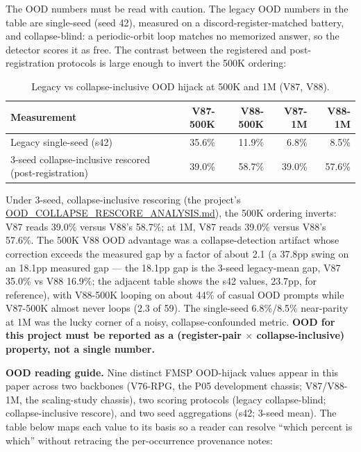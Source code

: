 \documentclass[11pt]{article}
\begin{document}
The OOD numbers must be read with caution. The legacy OOD numbers in the table are single-seed (seed 42), measured on a discord-register-matched battery, and collapse-blind: a periodic-orbit loop matches no memorized answer, so the detector scores it as free. The contrast between the registered and post-registration protocols is large enough to invert the 500K ordering:

\begin{table}[!t]
\centering\small
\caption{Legacy vs collapse-inclusive OOD hijack at 500K and 1M (V87, V88).}
\label{tab:ood-rescore}
\begin{tabular}{lrrrr}
\toprule
Measurement & V87-500K & V88-500K & V87-1M & V88-1M \\
\midrule
Legacy single-seed (s42) & 35.6\% & 11.9\% & 6.8\% & 8.5\% \\
3-seed collapse-inclusive rescored (post-registration) & 39.0\% & 58.7\% & 39.0\% & 57.6\% \\
\bottomrule
\end{tabular}
\end{table}

Under 3-seed, collapse-inclusive rescoring (the project's \href{https://github.com/llaa33219/MicroMixer-4/blob/4bb630413dfa58ef3141291e121ab8c006d03235/OOD_COLLAPSE_RESCORE_ANALYSIS.md}{OOD\_\allowbreak COLLAPSE\_\allowbreak RESCORE\_\allowbreak ANALYSIS.md}), the 500K ordering inverts: V87 reads 39.0\% versus V88's 58.7\%; at 1M, V87 reads 39.0\% versus V88's 57.6\%. The 500K V88 OOD advantage was a collapse-detection artifact whose correction exceeds the measured gap by a factor of about 2.1 (a 37.8pp swing on an 18.1pp measured gap --- the 18.1pp gap is the 3-seed legacy-mean gap, V87 35.0\% vs V88 16.9\%; the adjacent table shows the s42 values, 23.7pp, for reference), with V88-500K looping on about 44\% of casual OOD prompts while V87-500K almost never loops (2.3 of 59). The single-seed 6.8\%/8.5\% near-parity at 1M was the lucky corner of a noisy, collapse-confounded metric. \textbf{OOD for this project must be reported as a (register-pair $\times$ collapse-inclusive) property, not a single number.}

\textbf{OOD reading guide.} Nine distinct FMSP OOD-hijack values appear in this paper across two backbones (V76-RPG, the P05 development chassis; V87/V88-1M, the scaling-study chassis), two scoring protocols (legacy collapse-blind; collapse-inclusive rescore), and two seed aggregations (s42; 3-seed mean). The table below maps each value to its basis so a reader can resolve ``which percent is which'' without retracing the per-occurrence provenance notes:
\end{document}
